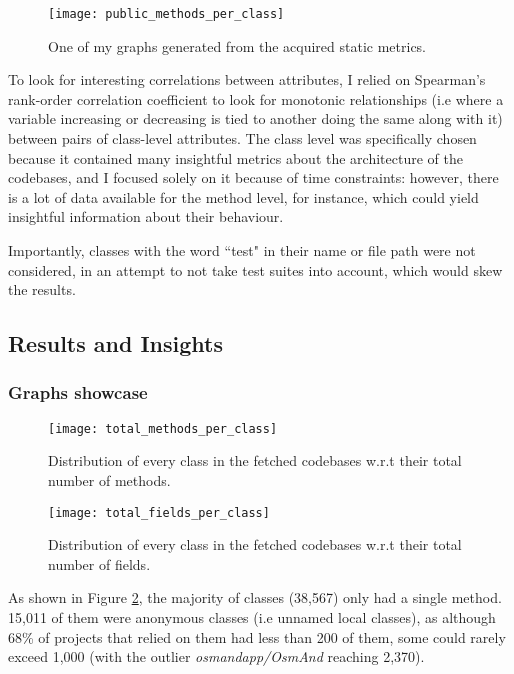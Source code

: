 \documentclass[12pt]{article}
\begin{document}
\begin{figure}[h!]
	\centering
	\texttt{[image: public\_methods\_per\_class]}
	\caption{One of my graphs generated from the acquired static metrics.}
	\label{fig:customgraphexample}
\end{figure}

To look for interesting correlations between attributes, I relied on Spearman's rank-order correlation coefficient to look for monotonic relationships (i.e where a variable increasing or decreasing is tied to another doing the same along with it) between pairs of class-level attributes. The class level was specifically chosen because it contained many insightful metrics about the architecture of the codebases, and I focused solely on it because of time constraints: however, there is a lot of data available for the method level, for instance, which could yield insightful information about their behaviour. 

Importantly, classes with the word ``test" in their name or file path were not considered, in an attempt to not take test suites into account, which would skew the results. 

\clearpage
\subsection{Results and Insights}

\subsubsection{Graphs showcase}

\begin{figure}[h!]
	\centering
	\texttt{[image: total\_methods\_per\_class]}
	\captionsetup{justification=centering}
	\caption{Distribution of every class in the fetched codebases w.r.t their total number of methods.}
	\label{fig:totalmethods}
\end{figure}


\begin{figure}[h!]
	\centering
	\texttt{[image: total\_fields\_per\_class]}
	\captionsetup{justification=centering}
	\caption{Distribution of every class in the fetched codebases w.r.t their total number of fields.}
	\label{fig:totalfields}
\end{figure}

As shown in Figure \ref{fig:totalmethods}, the majority of classes (38,567) only had a single method. 15,011 of them were anonymous classes (i.e unnamed local classes), as although 68\% of projects that relied on them had less than 200 of them, some could rarely exceed 1,000 (with the outlier \textit{osmandapp/OsmAnd} reaching 2,370). 
	
\end{document}
